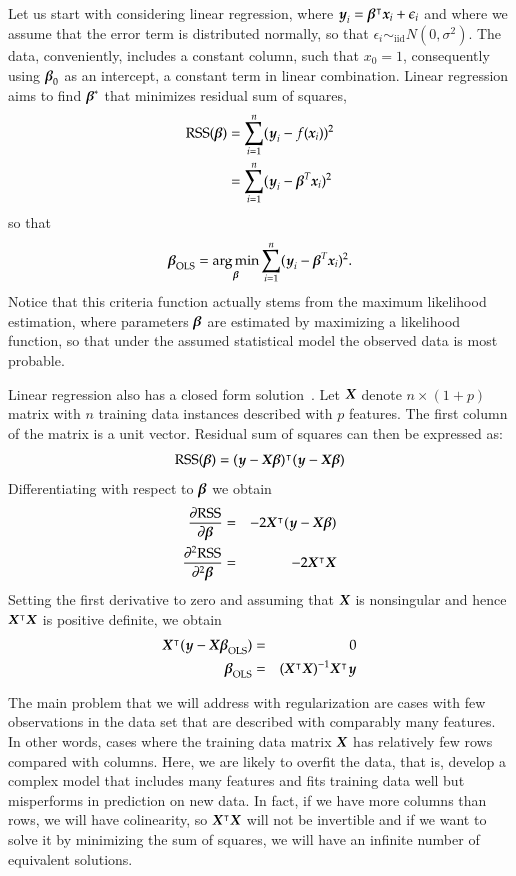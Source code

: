 \begin{refsection}

Let us start with considering linear regression, where $\boldsymbol{y}_i = \boldsymbol{\beta}^\intercal \boldsymbol{x}_i + \epsilon_i$ and where we assume that the error term is distributed normally, so that $\epsilon_i \sim_\text{iid} N(0, \sigma^2)$. The data, conveniently, includes a constant column, such that $x_0=1$, consequently using $\boldsymbol{\beta}_0$ as an intercept, a constant term in linear combination. Linear regression aims to find $\boldsymbol{\beta}^*$ that minimizes residual sum of squares,
\begin{align*}
{\rm RSS}(\boldsymbol{\beta}) & = \sum_{i=1}^n (\boldsymbol{y}_i-f(\boldsymbol{x}_i))^2 \\
& = \sum_{i=1}^n (\boldsymbol{y}_i - \boldsymbol{\beta}^T\boldsymbol{x}_i)^2 
\end{align*}
so that
$$\boldsymbol{\beta}_{\rm OLS} = \operatorname*{arg\,min}_{\boldsymbol{\beta}} \sum_{i=1}^n (\boldsymbol{y}_i - \boldsymbol{\beta}^T\boldsymbol{x}_i)^2.$$
Notice that this criteria function actually stems from the maximum likelihood estimation, where parameters $\boldsymbol{\beta}$ are estimated by maximizing a likelihood function, so that under the assumed statistical model the observed data is most probable.

Linear regression also has a closed form solution~\cite{ESL}. Let $\boldsymbol{X}$ denote $n\times (1+p)$ matrix with $n$ training data instances described with $p$ features. The first column of the matrix is a unit vector. Residual sum of squares can then be expressed as:
$$
{\rm RSS}(\boldsymbol{\beta}) = (\boldsymbol{y}-\boldsymbol{X}\boldsymbol{\beta})^\intercal (\boldsymbol{y}-\boldsymbol{X}\boldsymbol{\beta})
$$
Differentiating with respect to $\boldsymbol{\beta}$ we obtain 
\begin{eqnarray*}
\frac{\partial{\rm RSS}}{\partial \boldsymbol{\beta}} & = & -2\boldsymbol{X}^\intercal (\boldsymbol{y} - \boldsymbol{X}\boldsymbol{\beta}) \\
\frac{\partial^2{\rm RSS}}{\partial^2\boldsymbol{\beta}} & = & -2\boldsymbol{X}^\intercal\boldsymbol{X}
\end{eqnarray*}
Setting the first derivative to zero and assuming that $\boldsymbol{X}$ is nonsingular and hence $\boldsymbol{X}^\intercal\boldsymbol{X}$ is positive definite, we obtain
\begin{eqnarray*}
\boldsymbol{X}^\intercal (\boldsymbol{y} - \boldsymbol{X}\boldsymbol{\beta}_{\rm OLS}) & = & 0 \\
\boldsymbol{\beta}_{\rm OLS} & = & (\boldsymbol{X}^\intercal\boldsymbol{X})^{-1}\boldsymbol{X}^\intercal\boldsymbol{y}
\end{eqnarray*}

The main problem that we will address with regularization are cases with few observations in the data set that are described with comparably many features. In other words, cases where the training data matrix $\boldsymbol{X}$ has relatively few rows compared with columns. Here, we are likely to overfit the data, that is, develop a complex model that includes many features and fits training data well but misperforms in prediction on new data. In fact, if we have more columns than rows, we will have colinearity, so $\boldsymbol{X}^\intercal\boldsymbol{X}$ will not be invertible and if we want to solve it by minimizing the sum of squares, we will have an infinite number of equivalent solutions.


\end{refsection}
